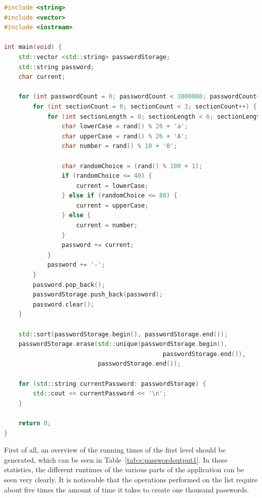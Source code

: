 \begin{lstlisting}[float, language=C++, caption=\CPP Code Showing the \PASSWORDGEN Application., label=lst:e:perf_passwords]
#include <string>
#include <vector>
#include <iostream>

int main(void) {
    std::vector <std::string> passwordStorage;
    std::string password;
    char current;

    for (int passwordCount = 0; passwordCount < 1000000; passwordCount++) {
        for (int sectionCount = 0; sectionCount < 3; sectionCount++) {
            for (int sectionLength = 0; sectionLength < 6; sectionLength++) {
                char lowerCase = rand() % 26 + 'a';
                char upperCase = rand() % 26 + 'A';
                char number = rand() % 10 + '0';

                char randomChoice = (rand() % 100 + 1);
                if (randomChoice <= 40) {
                    current = lowerCase;
                } else if (randomChoice <= 80) {
                    current = upperCase;
                } else {
                    current = number;
                }
                password += current;
            }
            password += '-';
        }
        password.pop_back();
        passwordStorage.push_back(password);
        password.clear();
    }

    std::sort(passwordStorage.begin(), passwordStorage.end());
    passwordStorage.erase(std::unique(passwordStorage.begin(),
                                            passwordStorage.end()),
                          passwordStorage.end());

    for (std::string currentPassword: passwordStorage) {
        std::cout << currentPassword << '\n';
    }

    return 0;
}
\end{lstlisting} 

First of all, an overview of the running times of the first level should be generated, which can be seen in Table~\ref{tab:e:passwordoutput1}. In these statistics, the different runtimes of the various parts of the application can be seen very clearly. It is noticeable that the operations performed on the list require about five times the amount of time it takes to create one thousand passwords. 

